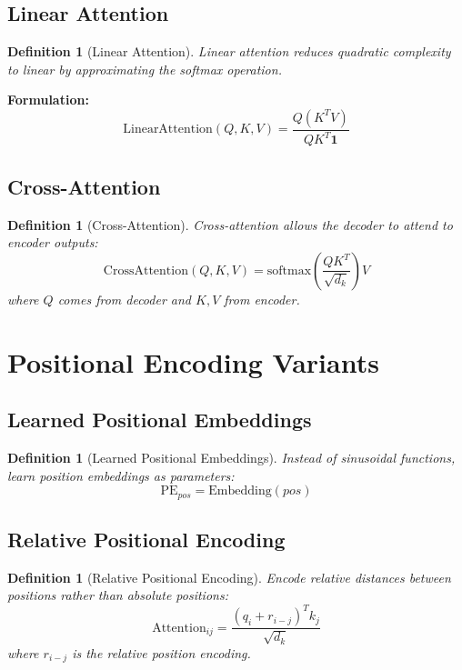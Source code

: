 \documentclass[11pt,a4paper]{article}
\newtheorem{definition}[theorem]{Definition}
\begin{document}
\subsection{Linear Attention}

\begin{definition}[Linear Attention]
Linear attention reduces quadratic complexity to linear by approximating the softmax operation.
\end{definition}

\textbf{Formulation:}
$$\text{LinearAttention}(Q,K,V) = \frac{Q(K^TV)}{QK^T\mathbf{1}}$$

\subsection{Cross-Attention}

\begin{definition}[Cross-Attention]
Cross-attention allows the decoder to attend to encoder outputs:
$$\text{CrossAttention}(Q,K,V) = \text{softmax}\left(\frac{QK^T}{\sqrt{d_k}}\right)V$$
where $Q$ comes from decoder and $K,V$ from encoder.
\end{definition}

\section{Positional Encoding Variants}

\subsection{Learned Positional Embeddings}

\begin{definition}[Learned Positional Embeddings]
Instead of sinusoidal functions, learn position embeddings as parameters:
$$\text{PE}_{pos} = \text{Embedding}(pos)$$
\end{definition}

\subsection{Relative Positional Encoding}

\begin{definition}[Relative Positional Encoding]
Encode relative distances between positions rather than absolute positions:
$$\text{Attention}_{ij} = \frac{(q_i + r_{i-j})^T k_j}{\sqrt{d_k}}$$
where $r_{i-j}$ is the relative position encoding.
\end{definition}
\end{document}

